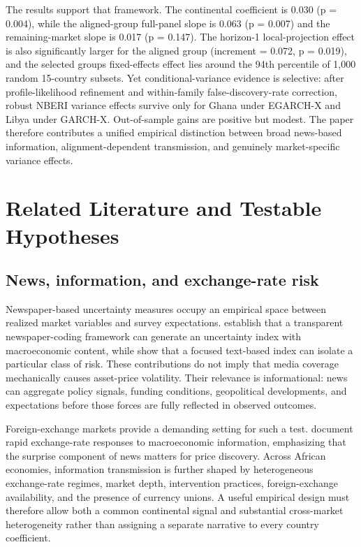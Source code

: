 \documentclass[11pt]{article}
\begin{document}
The results support that framework. The continental coefficient is 0.030
(p = 0.004), while the aligned-group full-panel slope is 0.063 (p =
0.007) and the remaining-market slope is 0.017 (p = 0.147). The
horizon-1 local-projection effect is also significantly larger for the
aligned group (increment = 0.072, p = 0.019), and the selected
group\textquotesingle s fixed-effects effect lies around the 94th
percentile of 1,000 random 15-country subsets. Yet conditional-variance
evidence is selective: after profile-likelihood refinement and
within-family false-discovery-rate correction, robust NBERI variance
effects survive only for Ghana under EGARCH-X and Libya under GARCH-X.
Out-of-sample gains are positive but modest. The paper therefore
contributes a unified empirical distinction between broad news-based
information, alignment-dependent transmission, and genuinely
market-specific variance effects.

\section{Related Literature and Testable Hypotheses}\label{related-literature-and-testable-hypotheses}

\subsection{News, information, and exchange-rate
risk}\label{news-information-and-exchange-rate-risk}

Newspaper-based uncertainty measures occupy an empirical space between
realized market variables and survey expectations. \citet{baker2016} establish that a transparent newspaper-coding framework can
generate an uncertainty index with macroeconomic content, while \citet{caldara2022} show that a focused text-based index can isolate a
particular class of risk. These contributions do not imply that media
coverage mechanically causes asset-price volatility. Their relevance is
informational: news can aggregate policy signals, funding conditions,
geopolitical developments, and expectations before those forces are
fully reflected in observed outcomes.

Foreign-exchange markets provide a demanding setting for such a test.
\citet{andersen2003} document rapid exchange-rate responses to
macroeconomic information, emphasizing that the surprise component of
news matters for price discovery. Across African economies, information
transmission is further shaped by heterogeneous exchange-rate regimes,
market depth, intervention practices, foreign-exchange availability, and
the presence of currency unions. A useful empirical design must
therefore allow both a common continental signal and substantial
cross-market heterogeneity rather than assigning a separate narrative to
every country coefficient.
\end{document}
